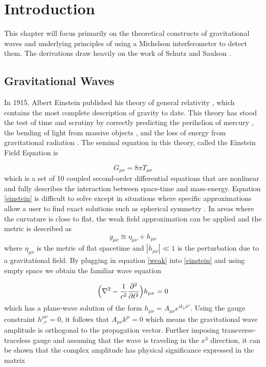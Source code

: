 \chapter{Introduction}\label{intro}

	This chapter will focus primarily on the theoretical constructs of gravitational waves and underlying principles of using a Michelson interferometer to detect them. The derivations draw heavily on the work of Schutz \cite{SchutzGR} and Saulson \cite{Saulson}.

	\section{Gravitational Waves}\label{gravitational waves}
	In 1915, Albert Einstein published his theory of general relativity \cite{einstein}, which contains the most complete description of gravity to date.  This theory has stood the test of time and scrutiny by correctly predicting the perihelion of mercury \cite{Einstein_GR}, the bending of light from massive objects \cite{DysonEddington}, and the loss of energy from gravitational radiation \cite{HulseTaylor}. The seminal equation in this theory, called the Einstein Field Equation is
	
	\begin{equation} \label{einstein}
	G_{\mu \nu} = 8 \pi T_{\mu \nu}
	\end{equation}
	which is a set of 10 coupled second-order differential equations that are nonlinear and fully describes the interaction between space-time and mass-energy. Equation \ref{einstein} is difficult to solve except in situations where specific approximations allow a user to find exact solutions such as spherical symmetry \cite{carroll_2003} \cite{schutz_2009}. In areas where the curvature is close to flat,  the weak field approximation can be applied and the metric is described as	
	\begin{equation} \label{weak}
	g_{\mu \nu}  \approxeq \eta_{\mu \nu} + h_{\mu \nu}
	\end{equation}
	where $\eta_{\mu \nu}$ is the metric of flat spacetime and $|h_{\mu \nu}| \ll 1$ is the perturbation due to a gravitational field.	By plugging in equation \ref{weak} into \ref{einstein} and using empty space we obtain the familiar wave equation
	
	\begin{equation} \label{wave}
	\Big(\nabla^2 - \frac{1}{c^2} \pdv[2]{t} \Big) h_{\mu \nu}  = 0
	\end{equation}
	which has a plane-wave solution of the form $h_{\mu \nu} = A_{\mu \nu} e^{ik_{\nu} x^{\nu}}$. Using the gauge constraint $h^{\mu \nu}_{,\nu} = 0$, it follows that $A_{\mu \nu} k^{\mu} = 0$ which means the gravitational wave amplitude is orthogonal to the propagation vector. Further imposing transverse-traceless gauge and assuming that the wave is traveling in the $x^3$ direction, it can be shown that the complex amplitude has physical significance expressed in the matrix
	
